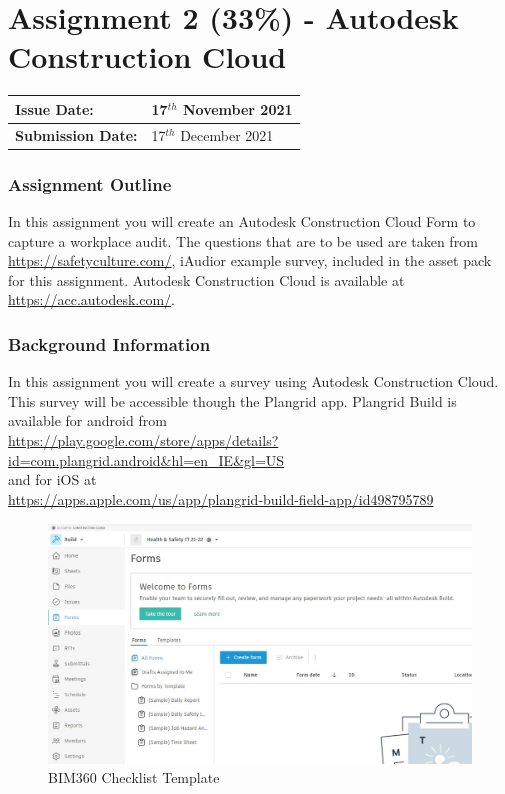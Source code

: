 
	
\part*{Assignment 2 (33\%) - Autodesk Construction Cloud}

\begin{tabularx}{\textwidth}{ |X|X| }
	\hline
	\textbf{Issue Date:} & 17$^{th}$ November 2021 \\
	\hline 
	\textbf{Submission Date:}  & 17$^{th}$ December 2021  \\
	\hline
\end{tabularx}


\section*{Assignment Outline}


In this assignment you will create an Autodesk Construction Cloud Form to capture a workplace audit.  The questions that are to be used are taken from \href{https://safetyculture.com/}{https://safetyculture.com/}, iAudior example survey, included in the asset pack for this assignment.  Autodesk Construction Cloud is available at \href{https://acc.autodesk.com/}{https://acc.autodesk.com/}.


\section*{Background Information}

In this assignment you will create a survey using Autodesk Construction Cloud.  This survey will be accessible though the Plangrid app.  Plangrid Build is available for android from\\ \href{https://play.google.com/store/apps/details?id=com.plangrid.android&hl=en_IE&gl=US}{https://play.google.com/store/apps/details?id=com.plangrid.android\&hl=en\_IE\&gl=US} \\and for iOS at\\ \href{https://apps.apple.com/us/app/plangrid-build-field-app/id498795789}{https://apps.apple.com/us/app/plangrid-build-field-app/id498795789}\\ 


\begin{figure}
	\centering
	\includegraphics[width=1.0\linewidth]{./img/ACC-Forms.jpg}
	\caption{BIM360 Checklist Template}
	\label{fig:BIM369ChecklistTemplate}
\end{figure}


